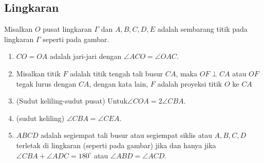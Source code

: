 \subsection{Lingkaran}

\begin{center}
\end{center}

    
Misalkan $O$ pusat lingkaran $\Gamma$ dan $A,B,C,D,E$ adalah sembarang titik pada lingkaran $\Gamma$ seperti pada gambar.
\begin{enumerate}
    \item $CO=OA$ adalah jari-jari dengan $\angle ACO = \angle OAC$.
    \item Misalkan titik $F$ adalah titik tengah tali busur $CA$, maka $OF \perp CA$ atau $OF$ tegak lurus dengan $CA$, dengan kata lain, $F$ adalah proyeksi titik $O$ ke $CA$
    \item (Sudut keliling-sudut pusat) Untuk$\angle COA = 2\angle CBA$.
    \item (sudut keliling) $\angle CBA = \angle CEA$.
    \item $ABCD$ adalah segiempat tali busur atau segiempat siklis  atau $A,B,C,D$ terletak di lingkaran (seperti pada gambar) jika dan hanya jika $\angle CBA + \angle ADC = 180^\circ$ atau $\angle ABD = \angle ACD$.
\end{enumerate}